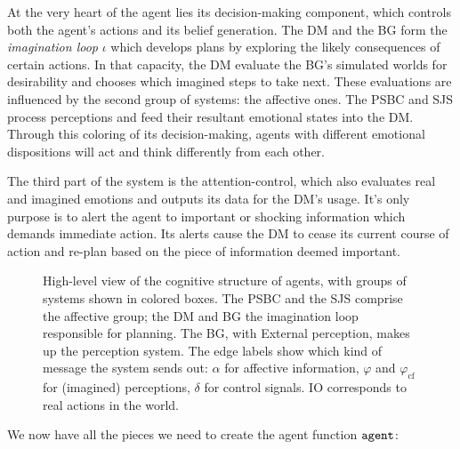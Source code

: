 At the very heart of the agent lies its decision-making component, which controls both the agent's actions and its belief generation. The DM and the BG form the {\em imagination loop} $\iota$ which develops plans by exploring the likely consequences of certain actions. In that capacity, the DM evaluate the BG's simulated worlds for desirability and chooses which imagined steps to take next. These evaluations are influenced by the second group of systems: the affective ones. The PSBC and SJS process perceptions and feed their resultant emotional states into the DM. Through this coloring of its decision-making, agents with different emotional dispositions will act and think differently from each other.

The third part of the system is the attention-control, which also evaluates real and imagined emotions and outputs its data for the DM's usage. It's only purpose is to alert the agent to important or shocking information which demands immediate action. Its alerts cause the DM to cease its current course of action and re-plan based on the piece of information deemed important.

\begin{figure}
	\centering
	
	\caption{High-level view of the cognitive structure of agents, with groups of systems shown in colored boxes. The PSBC and the SJS comprise the affective group; the DM and BG the imagination loop responsible for planning. The BG, with External perception, makes up the perception system. The edge labels show which kind of message the system sends out: $\alpha$ for affective information, $\varphi$ and $\varphi_{\mathrm{cf}}$ for (imagined) perceptions, $\delta$ for control signals. IO corresponds to real actions in the world.}
	\label{fig:cognitive_system}
\end{figure}

We now have all the pieces we need to create the agent function $\mathtt{agent}$:


